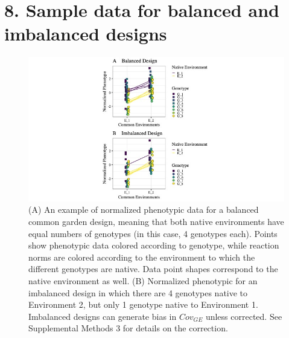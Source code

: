 \documentclass[11pt, oneside]{amsart}
\begin{document}
\clearpage
\newpage

\renewcommand{\figurename}{Supplementary Figure}
\section{8. Sample data for balanced and imbalanced designs}
\renewcommand\thefigure{S8}
\begin{figure}[h]
\begin{center}
\includegraphics[width=6in]{Figs/Balanced_Imbalanced.jpg}
\end{center}
\label{Fig: }
\caption[Examples of sample data and reaction norms for balanced (A) vs. imbalanced designs (B) that correspond to Supplementary Table 1 above. ] {(A) An example of normalized phenotypic data for a balanced common garden design, meaning that both native environments have equal numbers of genotypes (in this case, 4 genotypes each). Points show phenotypic data colored according to genotype, while reaction norms are colored according to the environment to which the different genotypes are native. Data point shapes correspond to the native environment as well.  (B) Normalized phenotypic for an imbalanced design in which there are 4 genotypes native to Environment 2, but only 1 genotype native to Environment 1. Imbalanced designs can generate bias in $Cov_{GE}$ unless corrected. See Supplemental Methods 3 for details on the correction. }

\end{figure}

\clearpage
\newpage
\end{document}
